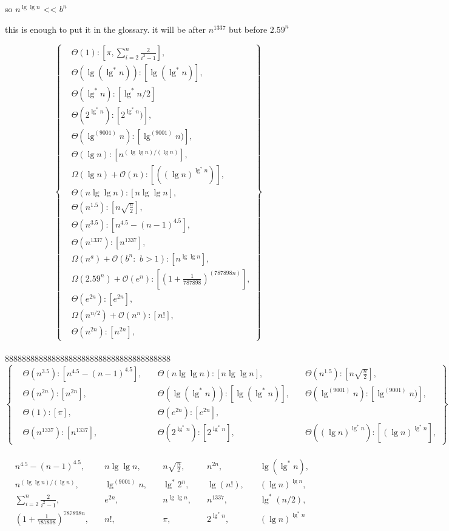 \documentclass[11pt,fleqn]{article}
\theoremstyle{definition}
\theoremstyle{remark}
\begin{document}
so $n^{\lg \lg n}$ << $b^n$

this is enough to put it in the glossary. 
it will be after $n^{1337}$ but before $2.59^n$

\[
\left\{
\begin{aligned}
& \Theta(1): [\pi, \sum_{i=2}^{n} \frac{2}{i^2 - 1}],\\
& \Theta(\lg(\lg^*n)): [\lg(\lg^*n)],\\
& \Theta(\lg^* n): [\lg^* n/2]\\
& \Theta(2^{\lg^*n}): [2^{\lg^*n})],\\
& \Theta(\lg^{(9001)} n): [\lg^{(9001)} n)],\\
& \Theta(\lg n): [n^{({\lg \lg n})/({\lg n})}],\\
& \Omega(\lg n) + \mathcal{O}(n): [({(\lg n)}^{\lg^*{n}})],\\
& \Theta(n\lg \lg n): [n\lg \lg n],\\
& \Theta(n^{1.5}): [n\sqrt{\frac{n}{2}}],\\
& \Theta(n^{3.5}): [n^{4.5} - (n - 1)^{4.5}],\\ 
& \Theta(n^{1337}): [n^{1337}],\\
& \Omega(n^a) + \mathcal{O}(b^n:\,\, b > 1): [n^{\lg \lg n}],\\
& \Omega(2.59^n) + \mathcal{O}(e^n): [{(1 + \frac{1}{787898})}^{(787898n)}],\\
& \Theta(e^{2n}): [e^{2n}],\\
& \Omega(n^{n/2}) + \mathcal{O}(n^n): [n!],\\
& \Theta(n^{2n}): [n^{2n}],
\end{aligned}
\right\}
\]\\

888888888888888888888888888888888888888 
\[
\left\{
\begin{aligned}
& \Theta(n^{3.5}): [n^{4.5} - (n - 1)^{4.5}], 
& \quad \Theta(n \lg \lg n): [n \lg \lg n],
& \quad \Theta(n^{1.5}): [n\sqrt{\frac{n}{2}}],\\
& \Theta(n^{2n}): [n^{2n}],
& \quad \Theta(\lg(\lg^*n)): [\lg(\lg^*n)],
& \quad \Theta(\lg^{(9001)} n): [\lg^{(9001)} n)],\\
& \Theta(1): [\pi],
& \quad \Theta(e^{2n}): [e^{2n}],\\
& \Theta(n^{1337}): [n^{1337}],
& \quad \Theta(2^{\lg^*{n}}): [2^{\lg^*{n}}],
& \quad \Theta({(\lg n)}^{\lg^*{n}}): [{(\lg n)}^{\lg^*{n}}],
\end{aligned}
\right\}
\]\\


\[
\begin{aligned}
& n^{4.5} - (n - 1)^{4.5}, & \quad n \lg \lg n, & \quad n\sqrt{\frac{n}{2}}, & \quad n^{2n}, & \quad \lg(\lg^*n), \\
& n^{({\lg \lg n})/({\lg n})}, & \quad \lg^{(9001)} n, & \quad \lg^*2^{n}, & \quad \lg(n!), & \quad (\lg n)^{\lg n}, \\
& \sum_{i=2}^n \frac{2}{{i}^2-1}, & \quad e^{2n}, & \quad n^{\lg \lg n}, & \quad n^{1337}, & \quad \lg^*{(n/2)}, \\
& (1 + \frac{1}{787898})^{787898n}, & \quad n!, & \quad \pi, & \quad 2^{\lg^*n}, & \quad (\lg n)^{\lg^* n}
\end{aligned}
\]\\
\end{document}
